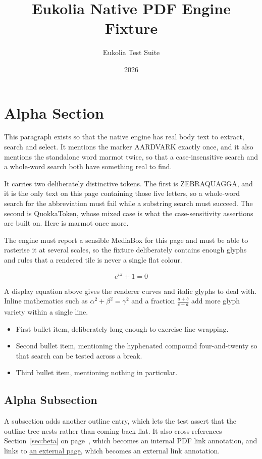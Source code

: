 \documentclass[11pt]{article}
\title{Eukolia Native PDF Engine Fixture}
\author{Eukolia Test Suite}
\date{2026}
\begin{document}
\maketitle
\tableofcontents
\newpage
\section{Alpha Section}
\label{sec:alpha}
This paragraph exists so that the native engine has real body text to extract,
search and select. It mentions the marker AARDVARK exactly once, and it also
mentions the standalone word marmot twice, so that a case-insensitive search and
a whole-word search both have something real to find.

It carries two deliberately distinctive tokens. The first is ZEBRAQUAGGA, and it
is the only text on this page containing those five letters, so a whole-word
search for the abbreviation must fail while a substring search must succeed. The
second is QuokkaToken, whose mixed case is what the case-sensitivity assertions
are built on. Here is marmot once more.

The engine must report a sensible MediaBox for this page and must be able to
rasterise it at several scales, so the fixture deliberately contains enough
glyphs and rules that a rendered tile is never a single flat colour.

\begin{equation}
  \label{eq:euler}
  e^{i\pi} + 1 = 0
\end{equation}

A display equation above gives the renderer curves and italic glyphs to deal
with. Inline mathematics such as $\alpha^2 + \beta^2 = \gamma^2$ and a fraction
$\frac{a+b}{c+d}$ add more glyph variety within a single line.

\begin{itemize}
  \item First bullet item, deliberately long enough to exercise line wrapping.
  \item Second bullet item, mentioning the hyphenated
        compound four-and-twenty so that search can be tested across a break.
  \item Third bullet item, mentioning nothing in particular.
\end{itemize}

\subsection{Alpha Subsection}
A subsection adds another outline entry, which lets the test assert that the
outline tree nests rather than coming back flat. It also cross-references
Section~\ref{sec:beta} on page~\pageref{sec:beta}, which becomes an internal
PDF link annotation, and links to \href{https://example.com/eukolia}{an external
page}, which becomes an external link annotation.
\end{document}
